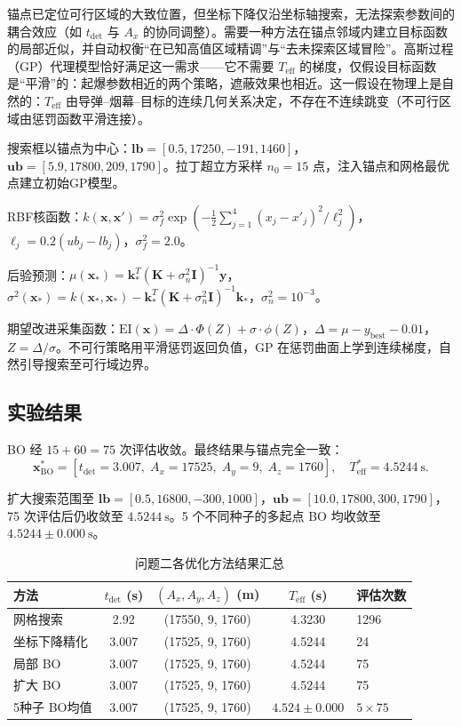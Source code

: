 \documentclass{ctexart}
\begin{document}
锚点已定位可行区域的大致位置，但坐标下降仅沿坐标轴搜索，无法探索参数间的耦合效应（如 $t_{\text{det}}$ 与 $A_x$ 的协同调整）。需要一种方法在锚点邻域内建立目标函数的局部近似，并自动权衡``在已知高值区域精调''与``去未探索区域冒险''。高斯过程（GP）代理模型恰好满足这一需求——它不需要 $T_{\text{eff}}$ 的梯度，仅假设目标函数是``平滑''的：起爆参数相近的两个策略，遮蔽效果也相近。这一假设在物理上是自然的：$T_{\text{eff}}$ 由导弹--烟幕--目标的连续几何关系决定，不存在不连续跳变（不可行区域由惩罚函数平滑连接）。

搜索框以锚点为中心：$\mathbf{lb} = [0.5, 17250, -191, 1460]$，$\mathbf{ub} = [5.9, 17800, 209, 1790]$。拉丁超立方采样 $n_0=15$ 点，注入锚点和网格最优点建立初始GP模型。

RBF核函数：$k(\mathbf{x}, \mathbf{x}') = \sigma_f^2 \exp(-\frac{1}{2}\sum_{j=1}^{4} (x_j - x'_j)^2/\ell_j^2)$，$\ell_j = 0.2(ub_j-lb_j)$，$\sigma_f^2 = 2.0$。

后验预测：$\mu(\mathbf{x}_*) = \mathbf{k}_*^T (\mathbf{K} + \sigma_n^2\mathbf{I})^{-1}\mathbf{y}$，$\sigma^2(\mathbf{x}_*) = k(\mathbf{x}_*,\mathbf{x}_*) - \mathbf{k}_*^T(\mathbf{K} + \sigma_n^2\mathbf{I})^{-1}\mathbf{k}_*$，$\sigma_n^2 = 10^{-3}$。

期望改进采集函数：$\mathrm{EI}(\mathbf{x}) = \Delta\cdot\Phi(Z) + \sigma\cdot\phi(Z)$，$\Delta = \mu - y_{\text{best}} - 0.01$，$Z = \Delta/\sigma$。不可行策略用平滑惩罚返回负值，GP 在惩罚曲面上学到连续梯度，自然引导搜索至可行域边界。

\subsection{实验结果}

BO 经 $15+60=75$ 次评估收敛。最终结果与锚点完全一致：
\[
\mathbf{x}^*_{\text{BO}} = [t_{\text{det}} = 3.007,\; A_x = 17525,\; A_y = 9,\; A_z = 1760], \quad T_{\text{eff}}^* = 4.5244\ \mathrm{s}.
\]

扩大搜索范围至 $\mathbf{lb}=[0.5,16800,-300,1000]$，$\mathbf{ub}=[10.0,17800,300,1790]$，75 次评估后仍收敛至 $4.5244\ \mathrm{s}$。5 个不同种子的多起点 BO 均收敛至 $4.5244 \pm 0.000\ \mathrm{s}$。

\begin{table}[H]
\centering
\caption{问题二各优化方法结果汇总}
\label{tab:p2-results}
\begin{tabular}{lcccl}
\toprule
\textbf{方法} & $t_{\text{det}}$ (s) & $(A_x, A_y, A_z)$ (m) & $T_{\text{eff}}$ (s) & \textbf{评估次数} \\
\midrule
网格搜索     & 2.92 & (17550, 9, 1760) & 4.3230 & 1296 \\
坐标下降精化 & 3.007 & (17525, 9, 1760) & 4.5244 & 24 \\
局部 BO     & 3.007 & (17525, 9, 1760) & 4.5244 & 75 \\
扩大 BO     & 3.007 & (17525, 9, 1760) & 4.5244 & 75 \\
5种子 BO均值& 3.007 & (17525, 9, 1760) & $4.524\pm 0.000$ & $5\times75$ \\
\bottomrule
\end{tabular}
\end{table}
\end{document}

